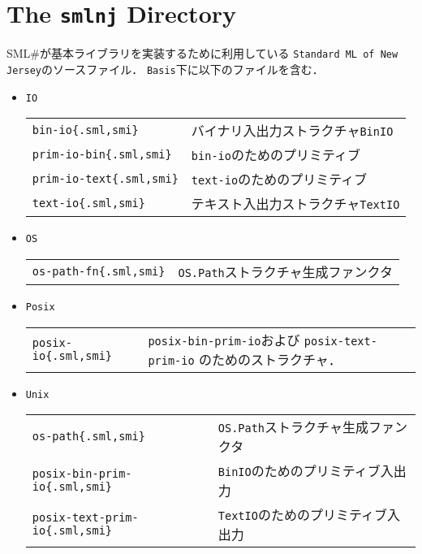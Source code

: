 \documentclass{jbook}
\newcommand{\txt}[2]{#2}
\newcommand{\smlsharp}{SML\#}
\newcommand{\code}[1]{\mbox{\large\tt #1}}
\begin{document}
\section{\txt{\code{smlnj}ディレクトリ}{The \code{smlnj} Directory}}
\ifjp%
	\smlsharp{}が基本ライブラリを実装するために利用している
\code{Standard ML of New Jersey}のソースファイル．
	\code{Basis}下に以下のファイルを含む．

\begin{itemize}
\item \code{IO}

\begin{tabular}{ll}
\code{bin-io\{.sml,smi\}} & バイナリ入出力ストラクチャ\code{BinIO}
\\
\code{prim-io-bin\{.sml,smi\}} & \code{bin-io}のためのプリミティブ
\\
\code{prim-io-text\{.sml,smi\}} & \code{text-io}のためのプリミティブ
\\
\code{text-io\{.sml,smi\}} & テキスト入出力ストラクチャ\code{TextIO}
\end{tabular}

\item \code{OS}

\begin{tabular}{ll}
\code{os-path-fn\{.sml,smi\}} & \code{OS.Path}ストラクチャ生成ファンクタ
\end{tabular}

\item \code{Posix}

\begin{tabular}{ll}
\code{posix-io\{.sml,smi\}} & 
\code{posix-bin-prim-io}および
\code{posix-text-prim-io}
のためのストラクチャ．
\end{tabular}

\item \code{Unix}

\begin{tabular}{ll}
\code{os-path\{.sml,smi\}} & \code{OS.Path}ストラクチャ生成ファンクタ
\\
\code{posix-bin-prim-io\{.sml,smi\}} & \code{BinIO}のためのプリミティブ入出力
\\
\code{posix-text-prim-io\{.sml,smi\}} & \code{TextIO}のためのプリミティブ入出力
\end{tabular}
\end{itemize}

\else%
\fi%
\end{document}
